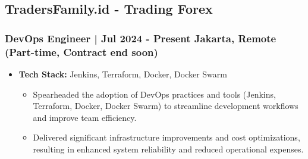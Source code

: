 \documentclass[11pt]{article}
\begin{document}
\subsection{TradersFamily.id - Trading Forex}
\subsubsection{DevOps Engineer | Jul 2024 - Present \hfill Jakarta, Remote (Part-time, Contract end soon)}
\begin{itemize}
    \item \textbf{Tech Stack:} Jenkins, Terraform, Docker, Docker Swarm
    \begin{itemize}
    \item Spearheaded the adoption of DevOps practices and tools (Jenkins, Terraform, Docker, Docker Swarm) to streamline development workflows and improve team efficiency.
    \item Delivered significant infrastructure improvements and cost optimizations, resulting in enhanced system reliability and reduced operational expenses.
    \end{itemize}
    

\end{itemize}
\end{document}

